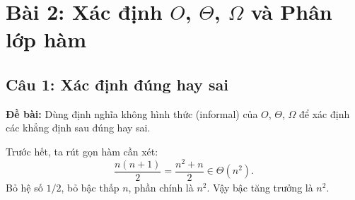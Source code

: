 \documentclass[12pt,a4paper]{article}
\begin{document}
\newpage
\section{Bài 2: Xác định $O$, $\Theta$, $\Omega$ và Phân lớp hàm}

\subsection{Câu 1: Xác định đúng hay sai}

\textbf{Đề bài:} Dùng định nghĩa không hình thức (informal) của $O$, $\Theta$, $\Omega$ để xác định các khẳng định sau đúng hay sai.

\bigskip

Trước hết, ta rút gọn hàm cần xét:
\[
  \frac{n(n+1)}{2} = \frac{n^2 + n}{2} \in \Theta(n^2).
\]
Bỏ hệ số $1/2$, bỏ bậc thấp $n$, phần chính là $n^2$. Vậy bậc tăng trưởng là $n^2$.

\bigskip
\end{document}
